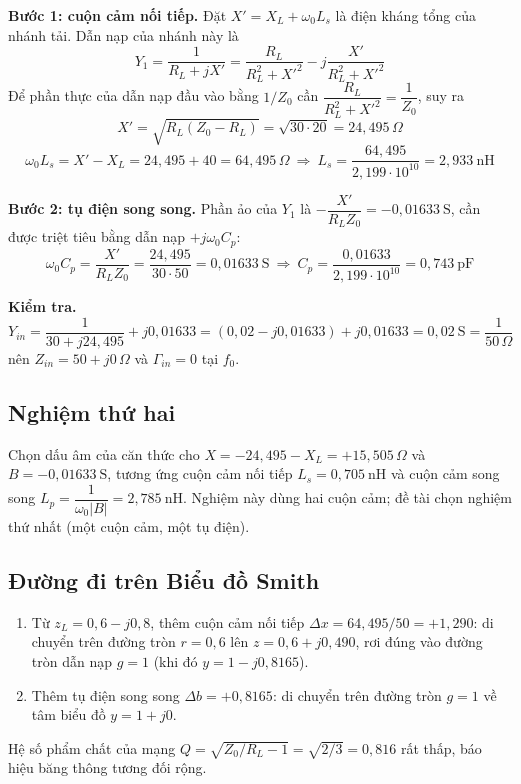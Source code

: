 \documentclass[a4paper]{report}
\newcommand\Zo{Z_0}
\begin{document}
\textbf{Bước 1: cuộn cảm nối tiếp.} Đặt $X'=X_L+\omega_0L_s$ là điện kháng tổng của nhánh tải. Dẫn nạp của nhánh này là
\begin{equation}
  Y_1=\frac{1}{R_L+jX'}=\frac{R_L}{R_L^2+X'^2}-j\frac{X'}{R_L^2+X'^2}
\end{equation}
Để phần thực của dẫn nạp đầu vào bằng $1/\Zo$ cần $\dfrac{R_L}{R_L^2+X'^2}=\dfrac{1}{\Zo}$, suy ra
\begin{equation}
  X'=\sqrt{R_L(\Zo-R_L)}=\sqrt{30\cdot20}=24{,}495\,\Omega
\end{equation}
\begin{equation}
  \omega_0L_s=X'-X_L=24{,}495+40=64{,}495\,\Omega\ \Rightarrow\
  L_s=\frac{64{,}495}{2{,}199\cdot10^{10}}=2{,}933\ \mathrm{nH}
\end{equation}

\textbf{Bước 2: tụ điện song song.} Phần ảo của $Y_1$ là $-\dfrac{X'}{R_L\Zo}=-0{,}01633\ \mathrm{S}$, cần được triệt tiêu bằng dẫn nạp $+j\omega_0C_p$:
\begin{equation}
  \omega_0C_p=\frac{X'}{R_L\Zo}=\frac{24{,}495}{30\cdot50}=0{,}01633\ \mathrm{S}\ \Rightarrow\
  C_p=\frac{0{,}01633}{2{,}199\cdot10^{10}}=0{,}743\ \mathrm{pF}
\end{equation}

\textbf{Kiểm tra.}
\begin{equation}
  Y_{in}=\frac{1}{30+j24{,}495}+j0{,}01633=(0{,}02-j0{,}01633)+j0{,}01633=0{,}02\ \mathrm{S}=\frac{1}{50\,\Omega}
\end{equation}
nên $Z_{in}=50+j0\,\Omega$ và $\Gamma_{in}=0$ tại $f_0$.

\subsection{Nghiệm thứ hai}
Chọn dấu âm của căn thức cho $X=-24{,}495-X_L=+15{,}505\,\Omega$ và $B=-0{,}01633\ \mathrm{S}$, tương ứng cuộn cảm nối tiếp $L_s=0{,}705\ \mathrm{nH}$ và cuộn cảm song song $L_p=\dfrac{1}{\omega_0|B|}=2{,}785\ \mathrm{nH}$. Nghiệm này dùng hai cuộn cảm; đề tài chọn nghiệm thứ nhất (một cuộn cảm, một tụ điện).

\subsection{Đường đi trên Biểu đồ Smith}
\begin{enumerate}
  \item Từ $z_L=0{,}6-j0{,}8$, thêm cuộn cảm nối tiếp $\Delta x=64{,}495/50=+1{,}290$: di chuyển trên đường tròn $r=0{,}6$ lên $z=0{,}6+j0{,}490$, rơi đúng vào đường tròn dẫn nạp $g=1$ (khi đó $y=1-j0{,}8165$).
  \item Thêm tụ điện song song $\Delta b=+0{,}8165$: di chuyển trên đường tròn $g=1$ về tâm biểu đồ $y=1+j0$.
\end{enumerate}
Hệ số phẩm chất của mạng $Q=\sqrt{\Zo/R_L-1}=\sqrt{2/3}=0{,}816$ rất thấp, báo hiệu băng thông tương đối rộng.
\end{document}
